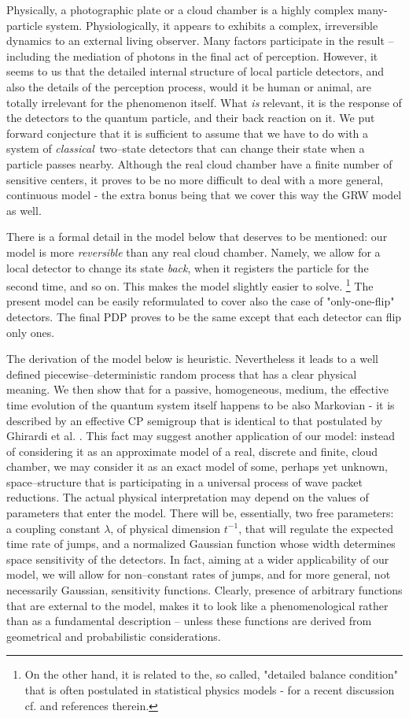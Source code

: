 \documentclass[12pt]{article}
\begin{document}
Physically, a photographic plate or a cloud chamber is a highly complex
many-particle system. Physiologically, it appears to exhibits a complex,
irreversible dynamics to an external living observer. Many factors
participate in the result -- including the mediation of photons in the
final act of perception. However, it seems to us that the detailed internal
structure of local particle detectors, and also the details of the
perception process, would it be human or animal, are totally irrelevant for
the phenomenon itself. What {\sl is} relevant, it is the response of the
detectors to the quantum particle, and their back reaction on it. We put
forward conjecture that it is sufficient to assume that we have to do with
a system of {\sl classical}\, two--state detectors that can change their
state when a particle passes nearby. Although the real cloud chamber have a
finite number of sensitive centers, it proves to be no more difficult to
deal with a more general, continuous model - the extra bonus being that we
cover this way the GRW model as well.

There is a formal detail in the model below that deserves to be mentioned:
our model is more {\sl reversible} than any real cloud chamber. Namely, we
allow for a local detector to change its state {\sl back}, when it
registers the particle for the second time, and so on. This makes the model
slightly easier to solve. \footnote{On the other hand, it is related to
the, so called, "detailed balance condition" that is often postulated in
statistical physics models - for a recent discussion cf. \cite{stree1} and
references therein.} The present model can be easily reformulated to cover
also the case of "only-one-flip" detectors. The final PDP proves to be the
same except that each detector can flip only ones.

The derivation of the model below is heuristic. Nevertheless it leads to a
well defined piecewise--deterministic random process that has a clear
physical meaning. We then show that for a passive, homogeneous, medium, the
effective time evolution of the quantum system itself happens to be also
Markovian - it is described by an effective CP semigroup that is identical
to that postulated by Ghirardi et al. \cite{ghi1}. This fact may suggest
another application of our model: instead of considering it as an
approximate model of a real, discrete and finite, cloud chamber, we may
consider it as an exact model of some, perhaps yet unknown,
space--structure that is participating in a universal process of wave
packet reductions. The actual physical interpretation may depend on the
values of parameters that enter the model. There will be, essentially, two
free parameters: a coupling constant $\lambda$, of physical dimension
$t^{-1}$, that will regulate the expected time rate of jumps, and a
normalized Gaussian function whose width determines space sensitivity of
the detectors. In fact, aiming at a wider applicability of our model, we
will allow for non--constant rates of jumps, and for more general, not
necessarily Gaussian, sensitivity functions. Clearly, presence of arbitrary
functions that are external to the model, makes it to look like a
phenomenological rather than as a fundamental description -- unless these
functions are derived from geometrical and probabilistic considerations.
\end{document}
